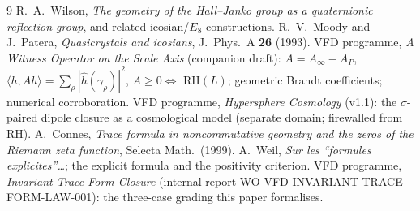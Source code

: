 \documentclass[11pt]{article}
\theoremstyle{definition}
\begin{document}
\begin{thebibliography}{9}
 R.~A.~Wilson, \emph{The geometry of the Hall--Janko group as a quaternionic
  reflection group}, and related icosian/$E_8$ constructions.
 R.~V.~Moody and J.~Patera, \emph{Quasicrystals and icosians},
  J.~Phys.~A \textbf{26} (1993).
 VFD programme, \emph{A Witness Operator on the Scale Axis} (companion
  draft): $A=A_\infty-A_P$, $\langle h,Ah\rangle=\sum_\rho|\widehat h(\gamma_\rho)|^2$,
  $A\ge0\iff$ RH$(L)$; geometric Brandt coefficients; numerical corroboration.
 VFD programme, \emph{Hypersphere Cosmology} (v1.1): the $\sigma$-paired
  dipole closure as a cosmological model (separate domain; firewalled from RH).
 A.~Connes, \emph{Trace formula in noncommutative geometry and the zeros of
  the Riemann zeta function}, Selecta Math.\ (1999).
 A.~Weil, \emph{Sur les ``formules explicites''\ldots}; the explicit formula
  and the positivity criterion.
 VFD programme, \emph{Invariant Trace-Form Closure} (internal report
  WO-VFD-INVARIANT-TRACE-FORM-LAW-001): the three-case grading this paper formalises.
\end{thebibliography}
\end{document}
